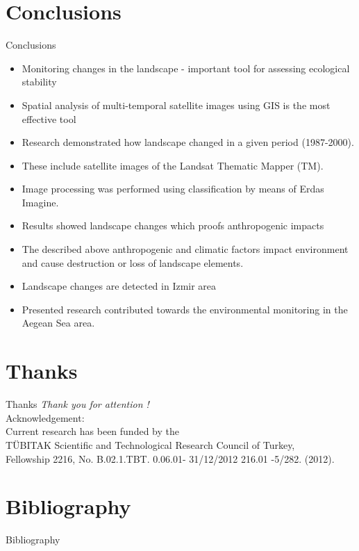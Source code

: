 \documentclass[pdflatex,compress,9pt,
	xcolor={dvipsnames,dvipsnames,svgnames,x11names,table},
	hyperref={colorlinks = true,breaklinks = true, urlcolor = NavyBlue, breaklinks = true}]{beamer}
\begin{document}
\section{Conclusions}
\begin{frame}{Conclusions}
\begin{itemize}
            \item Monitoring changes in the landscape - important tool for assessing ecological stability 
            \item Spatial analysis of multi-temporal satellite images using GIS is the most effective tool 
            \item Research demonstrated how landscape changed in a given period (1987-2000).
            \item These include satellite images of the Landsat Thematic Mapper (TM). 
            \item Image processing was performed using classification by means of Erdas Imagine. 
            \item Results showed landscape changes which proofs anthropogenic impacts 
            \item The described above anthropogenic and climatic factors impact environment and cause destruction or loss of landscape elements. 
            \item Landscape changes are detected in Izmir area 
            \item Presented research contributed towards the environmental monitoring in the Aegean Sea area.
\end{itemize}
\end{frame}

\section{Thanks}
\begin{frame}{Thanks}
  	\centering \Huge 
  	\emph{Thank you for attention !}\\
	\vspace{5em}
\normalsize
Acknowledgement: \\
Current research has been funded by the \\
T\"{U}BITAK Scientific and Technological Research Council of Turkey, \\
Fellowship 2216, No. B.02.1.TBT. 0.06.01- 31/12/2012 216.01 -5/282. (2012).
\end{frame}

\section{Bibliography}
\Large{Bibliography}
\nocite{*}
\printbibliography[heading=none]
	
\end{document}
